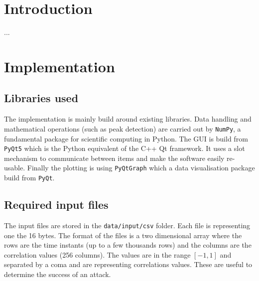 \documentclass[11pt,a4paper]{article}
\begin{document}


\section{Introduction}
\label{sec:introduction}
...

\section{Implementation}
\label{sec:implementation}
\subsection{Libraries used}
The implementation is mainly build around existing libraries. Data handling and mathematical operations (such as peak detection) are carried out by \texttt{NumPy}, a fundamental package for scientific computing in Python. The GUI is build from \texttt{PyQt5} which is the Python equivalent of the C++ Qt framework. It uses a slot mechanism to communicate between items and make the software easily re-usable. Finally the plotting is using \texttt{PyQtGraph} which a data visualisation package build from \texttt{PyQt}. 

\subsection{Required input files}
The input files are stored in the \texttt{data/input/csv} folder. Each file is representing one the 16 bytes. The format of the files is a two dimensional array where the rows are the time instants (up to a few thousands rows) and the columns are the correlation values (256 columns). The values are in the range $[-1, 1]$ and separated by a coma and are representing correlations values. These are useful to determine the success of an attack.
\end{document}
